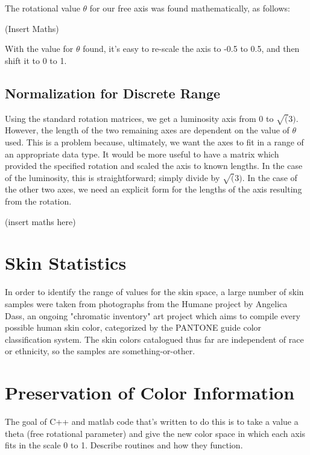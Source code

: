 \documentclass[10pt,a4paper]{article}
\begin{document}
The rotational value $\theta$ for our free axis was found mathematically, as follows:

(Insert Maths)

With the value for $\theta$ found, it's easy to re-scale the axis to -0.5 to 0.5, and then shift it to 0 to 1.


\subsection{Normalization for Discrete Range}\label{sec:NormalizationForDiscreteRange}

Using the standard rotation matrices, we get a luminosity axis from 0 to $\sqrt(3)$. However, the length of the two remaining axes are dependent on the value of $\theta$ used. This is a problem because, ultimately, we want the axes to fit in a range of an appropriate data type. It would be more useful to have a matrix which provided the specified rotation and scaled the axis to known lengths. In the case of the luminosity, this is straightforward; simply divide by $\sqrt(3)$. In the case of the other two axes, we need an explicit form for the lengths of the axis resulting from the rotation.

(insert maths here)

\section{Skin Statistics}\label{sec:SkinStatistics}

In order to identify the range of values for the skin space, a large number of skin samples were taken from photographs from the Humane project by Angelica Dass, an ongoing "chromatic inventory" art project which aims to compile every possible human skin color, categorized by the PANTONE guide color classification system. The skin colors catalogued thus far are independent of race or ethnicity, so the samples are something-or-other.


\section{Preservation of Color Information}\label{sec:PreservationOfColorInformation}

The goal of C++ and matlab code that's written to do this is to take a value a theta (free rotational parameter) and give the new color space in which each axis fits in the scale 0 to 1. Describe routines and how they function.
\end{document}

